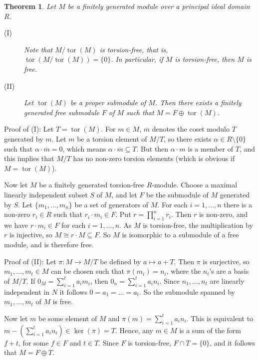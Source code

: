 \documentclass[12pt]{article}
\newtheorem*{thm*}{Theorem}
\def\tor{\operatorname{tor}}
\begin{document}
\begin{thm*}
Let $M$ be a finitely generated module over a principal ideal domain $R$.
\begin{description}
\item[(I)]
Note that $M/\tor(M)$ is torsion-free, that is, $\tor(M/\tor(M))=\{0\}$.
In particular, if $M$ is torsion-free, then $M$ is free.
\item[(II)]
Let $\tor(M)$ be a proper submodule of $M$.
Then there exists a finitely generated free submodule $F$ of $M$
such that $M=F \oplus \tor(M)$.
\end{description}
\end{thm*}
Proof of (I): Let $T=\tor(M)$.
For $m\in M$, $\overline{m}$ denotes the coset modulo $T$ generated by $m$.
Let $m$ be a torsion element of $M/T$,
so there exists $\alpha \in R \setminus \{0\}$
such that $\alpha\cdot \overline{m}=0$,
which means $\alpha\cdot \overline{m} \subseteq T$.
But then $\alpha \cdot m$ is a member of $T$,
and this implies that $M/T$ has no non-zero torsion elements
(which is obvious if $M=\tor(M)$).

Now let $M$ be a finitely generated torsion-free $R$-module.
Choose a maximal linearly independent subset $S$ of $M$,
and let $F$ be the submodule of $M$ generated by $S$.
Let $\{m_1,\dots,m_n\}$ be a set of generators of $M$.
For each $i=1,\dots,n$ there is a non-zero $r_i\in R$
such that $r_i\cdot m_i\in F$.
Put $r=\prod_{i=1}^n r_i$.
Then $r$ is non-zero,
and we have $r\cdot m_i\in F$ for each $i=1,\dots,n$.
As $M$ is torsion-free, the multiplication by $r$ is injective,
so $M \cong r \cdot M \subseteq F$.
So $M$ is isomorphic to a submodule of a free module, and is therefore free.

Proof of (II): Let $\pi\colon M \to M/T$ be defined by $a \mapsto a + T$.
Then $\pi$ is surjective,
so $m_1, \ldots, m_t \in M$ can be chosen such that $\pi(m_i)=n_i$,
where the $n_i$'s are a basis of $M/T$.
If $0_M=\sum_{i=1}^t a_im_i$, then $0_n=\sum_{i=1}^t a_in_i$.
Since $n_1,\ldots,n_t$ are linearly independent in $N$
it follows $0=a_1=\ldots =a_t$.
So the submodule spanned by $m_1,\ldots,m_t$ of $M$ is free.

Now let $m$ be some element of $M$ and $\pi(m)=\sum_{i=1}^t a_in_i$.
This is equivalent to $m-\left(\sum_{i=1}^t a_in_i\right) \in \ker(\pi)=T$.
Hence, any $m\in M$ is a sum of the form $f+t$,
for some $f \in F$ and $t \in T$. 
Since $F$ is torsion-free, $F \cap T=\{0\}$,
and it follows that $M=F \oplus T$.
\end{document}
